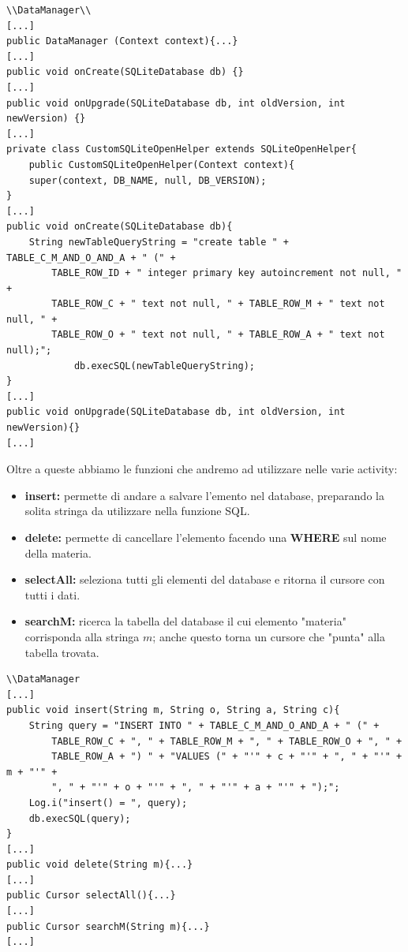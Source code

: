 \documentclass[a4paper, 50pt, twoside]{article}
\begin{document}
\begin{lstlisting}
\\DataManager\\
[...]
public DataManager (Context context){...}
[...]
public void onCreate(SQLiteDatabase db) {}
[...]
public void onUpgrade(SQLiteDatabase db, int oldVersion, int newVersion) {}
[...]
private class CustomSQLiteOpenHelper extends SQLiteOpenHelper{
	public CustomSQLiteOpenHelper(Context context){
	super(context, DB_NAME, null, DB_VERSION);
}
[...]
public void onCreate(SQLiteDatabase db){
	String newTableQueryString = "create table " + TABLE_C_M_AND_O_AND_A + " (" +
		TABLE_ROW_ID + " integer primary key autoincrement not null, " +
		TABLE_ROW_C + " text not null, " + TABLE_ROW_M + " text not null, " +
		TABLE_ROW_O + " text not null, " + TABLE_ROW_A + " text not null);";
            db.execSQL(newTableQueryString);
}
[...]
public void onUpgrade(SQLiteDatabase db, int oldVersion, int newVersion){}
[...]
\end{lstlisting}

Oltre a queste abbiamo le funzioni che andremo ad utilizzare nelle varie activity:
\begin{itemize}
\item \textbf{insert:} permette di andare a salvare l'emento nel database, preparando la solita stringa da utilizzare nella funzione SQL.
\item \textbf{delete:} permette di cancellare l'elemento facendo una \textbf{WHERE} sul nome della materia.
\item \textbf{selectAll:} seleziona tutti gli elementi del database e ritorna il cursore con tutti i dati.
\item \textbf{searchM:} ricerca la tabella del database il cui elemento "materia" corrisponda alla stringa $m$; anche questo torna un cursore che "punta" alla tabella trovata.
\end{itemize}
\begin{lstlisting}
\\DataManager
[...]
public void insert(String m, String o, String a, String c){
	String query = "INSERT INTO " + TABLE_C_M_AND_O_AND_A + " (" +
		TABLE_ROW_C + ", " + TABLE_ROW_M + ", " + TABLE_ROW_O + ", " +
		TABLE_ROW_A + ") " + "VALUES (" + "'" + c + "'" + ", " + "'" + m + "'" +
		", " + "'" + o + "'" + ", " + "'" + a + "'" + ");";
	Log.i("insert() = ", query);
	db.execSQL(query);
}
[...]
public void delete(String m){...}
[...]
public Cursor selectAll(){...}
[...]
public Cursor searchM(String m){...}
[...]
\end{lstlisting}
\end{document}
